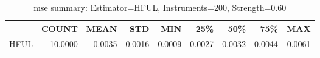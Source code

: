 \begin{table}[ht]
\centering
\caption{mse summary: Estimator=HFUL, Instruments=200, Strength=0.60}
\begin{tabular}{lrrrrrrrr}
\toprule
 & COUNT & MEAN & STD & MIN & 25\% & 50\% & 75\% & MAX \\
\midrule
HFUL & 10.0000 & 0.0035 & 0.0016 & 0.0009 & 0.0027 & 0.0032 & 0.0044 & 0.0061 \\
\bottomrule
\end{tabular}
\end{table}

